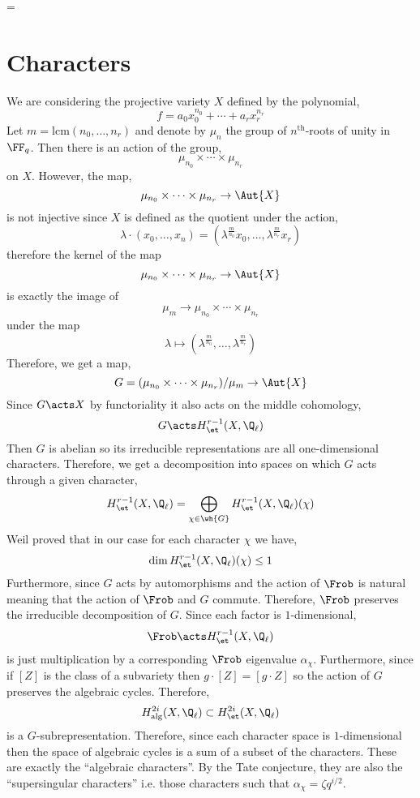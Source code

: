 =\documentclass[12pt]{article}
\begin{document}
\section{Characters}

\newcommand{\lcm}{\mathrm{lcm}}

We are considering the projective variety $X$ defined by the polynomial,
\[ f = a_0 x_0^{n_0} + \cdots + a_r x_r^{n_r} \]
Let $m = \lcm(n_0, \dots, n_r)$ and denote by $\mu_n$ the group of $n^{\text{th}}$-roots of unity in $\FF_q$. Then there is an action of the group,
\[ \mu_{n_0} \times \cdots \times \mu_{n_r} \]
on $X$. However, the map,
\[ \mu_{n_0} \times \cdots \times \mu_{n_r} \to \Aut{X} \]
is not injective since $X$ is defined as the quotient under the action,
\[ \lambda \cdot (x_0, \dots, x_n) = (\lambda^{\frac{m}{n_0}} x_0, \dots, \lambda^{\frac{m}{n_r}} x_r) \] 
therefore the kernel of the map 
\[ \mu_{n_0} \times \cdots \times \mu_{n_r} \to \Aut{X} \]
is exactly the image of
\[ \mu_m \to \mu_{n_0} \times \cdots \times \mu_{n_r} \]
under the map 
\[ \lambda \mapsto (\lambda^{\frac{m}{n_0}}, \dots, \lambda^{\frac{m}{n_r}}) \]
Therefore, we get a map,
\[ G = (\mu_{n_0} \times \cdots \times \mu_{n_r})/\mu_m \to \Aut{X} \]
Since $G \acts X$ by functoriality it also acts on the middle cohomology,
\[ G \acts H^{r-1}_{\et}(X, \Q_\ell) \]
Then $G$ is abelian so its irreducible representations are all one-dimensional characters. Therefore, we get a decomposition into spaces on which $G$ acts through a given character,
\[ H^{r-1}_{\et}(X, \Q_\ell) = \bigoplus_{\chi \in \wh{G}} H^{r-1}_{\et}(X, \Q_\ell)(\chi) \]
Weil proved that in our case for each character $\chi$ we have,
\[ \dim H^{r-1}_{\et}(X, \Q_\ell)(\chi) \le 1 \]
Furthermore, since $G$ acts by automorphisms and the action of $\Frob$ is natural meaning that the action of $\Frob$ and $G$ commute. Therefore, $\Frob$ preserves the irreducible decomposition of $G$. Since each factor is $1$-dimensional, 
\[ \Frob \acts H^{r-1}_{\et}(X, \Q_\ell) \]
is just multiplication by a corresponding $\Frob$ eigenvalue $\alpha_{\chi}$. Furthermore, since if $[Z]$ is the class of a subvariety then $g \cdot [Z] = [g \cdot Z]$ so the action of $G$ preserves the algebraic cycles. Therefore,
\[ H_{\text{alg}}^{2i}(X, \Q_\ell) \subset H^{2i}_{\et}(X, \Q_\ell) \]
is a $G$-subrepresentation. Therefore, since each character space is $1$-dimensional then the space of algebraic cycles is a sum of a subset of the characters. These are exactly the ``algebraic characters''. By the Tate conjecture, they are also the ``supersingular characters'' i.e. those characters such that $\alpha_{\chi} = \zeta q^{i/2}$. 
\end{document}
